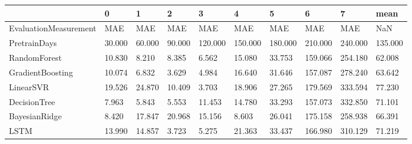 \begin{tabular}{llllllllll}
\toprule
{} &      0 &      1 &      2 &       3 &       4 &       5 &       6 &       7 &    mean \\
\midrule
EvaluationMeasurement &    MAE &    MAE &    MAE &     MAE &     MAE &     MAE &     MAE &     MAE &     NaN \\
PretrainDays          & 30.000 & 60.000 & 90.000 & 120.000 & 150.000 & 180.000 & 210.000 & 240.000 & 135.000 \\
RandomForest          & 10.830 &  8.210 &  8.385 &   6.562 &  15.080 &  33.753 & 159.066 & 254.180 &  62.008 \\
GradientBoosting      & 10.074 &  6.832 &  3.629 &   4.984 &  16.640 &  31.646 & 157.087 & 278.240 &  63.642 \\
LinearSVR             & 19.526 & 24.870 & 10.409 &   3.703 &  18.906 &  27.265 & 179.569 & 333.594 &  77.230 \\
DecisionTree          &  7.963 &  5.843 &  5.553 &  11.453 &  14.780 &  33.293 & 157.073 & 332.850 &  71.101 \\
BayesianRidge         &  8.420 & 17.847 & 20.968 &  15.156 &   8.603 &  26.041 & 175.158 & 258.938 &  66.391 \\
LSTM                  & 13.990 & 14.857 &  3.723 &   5.275 &  21.363 &  33.437 & 166.980 & 310.129 &  71.219 \\
\bottomrule
\end{tabular}
